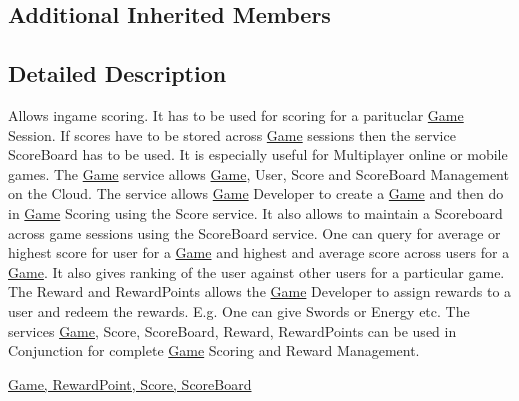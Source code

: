 \subsection*{Additional Inherited Members}


\subsection{Detailed Description}
Allows ingame scoring. It has to be used for scoring for a parituclar \hyperlink{classcom_1_1shephertz_1_1app42_1_1paas_1_1sdk_1_1csharp_1_1game_1_1_game}{Game} Session. If scores have to be stored across \hyperlink{classcom_1_1shephertz_1_1app42_1_1paas_1_1sdk_1_1csharp_1_1game_1_1_game}{Game} sessions then the service Score\+Board has to be used. It is especially useful for Multiplayer online or mobile games. The \hyperlink{classcom_1_1shephertz_1_1app42_1_1paas_1_1sdk_1_1csharp_1_1game_1_1_game}{Game} service allows \hyperlink{classcom_1_1shephertz_1_1app42_1_1paas_1_1sdk_1_1csharp_1_1game_1_1_game}{Game}, User, Score and Score\+Board Management on the Cloud. The service allows \hyperlink{classcom_1_1shephertz_1_1app42_1_1paas_1_1sdk_1_1csharp_1_1game_1_1_game}{Game} Developer to create a \hyperlink{classcom_1_1shephertz_1_1app42_1_1paas_1_1sdk_1_1csharp_1_1game_1_1_game}{Game} and then do in \hyperlink{classcom_1_1shephertz_1_1app42_1_1paas_1_1sdk_1_1csharp_1_1game_1_1_game}{Game} Scoring using the Score service. It also allows to maintain a Scoreboard across game sessions using the Score\+Board service. One can query for average or highest score for user for a \hyperlink{classcom_1_1shephertz_1_1app42_1_1paas_1_1sdk_1_1csharp_1_1game_1_1_game}{Game} and highest and average score across users for a \hyperlink{classcom_1_1shephertz_1_1app42_1_1paas_1_1sdk_1_1csharp_1_1game_1_1_game}{Game}. It also gives ranking of the user against other users for a particular game. The Reward and Reward\+Points allows the \hyperlink{classcom_1_1shephertz_1_1app42_1_1paas_1_1sdk_1_1csharp_1_1game_1_1_game}{Game} Developer to assign rewards to a user and redeem the rewards. E.\+g. One can give Swords or Energy etc. The services \hyperlink{classcom_1_1shephertz_1_1app42_1_1paas_1_1sdk_1_1csharp_1_1game_1_1_game}{Game}, Score, Score\+Board, Reward, Reward\+Points can be used in Conjunction for complete \hyperlink{classcom_1_1shephertz_1_1app42_1_1paas_1_1sdk_1_1csharp_1_1game_1_1_game}{Game} Scoring and Reward Management. 

\hyperlink{classcom_1_1shephertz_1_1app42_1_1paas_1_1sdk_1_1csharp_1_1game_1_1_score_service}{Game, Reward\+Point, Score, Score\+Board} 

